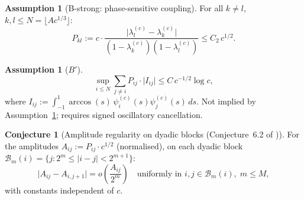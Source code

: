 \documentclass[12pt]{amsart}
\theoremstyle{definition}
\newtheorem{assumption}[theorem]{Assumption}
\newtheorem{conjecture}[theorem]{Conjecture}
\theoremstyle{remark}
\newcommand{\abs}[1]{\lvert#1\rvert}
\newcommand{\lam}[1]{\lambda_{#1}^{(c)}}
\begin{document}
\begin{assumption}[B-strong: phase-sensitive coupling]
\label{ass:Bstrong}
For all $k\neq l$, $k,l\leq N = \lfloor Ac^{1/3}\rfloor$:
\[
  P_{kl} := c\cdot
  \frac{\abs{\lam{l}-\lam{k}}}{(1-\lam{k})(1-\lam{l})}
  \leq C_2\,c^{1/2}.
\]
\end{assumption}

\begin{assumption}[$B'$]
\label{ass:Bprime}
\[
  \sup_{i\leq N}\sum_{j\neq i}P_{ij}\cdot\abs{I_{ij}}
  \leq C\,c^{-1/2}\log c,
\]
where $I_{ij}:=\int_{-1}^1\arccos(s)\,\psi_i^{(c)}(s)\psi_j^{(c)}(s)\,ds$.
Not implied by Assumption~\ref{ass:Bstrong};
requires signed oscillatory cancellation.
\end{assumption}

\begin{conjecture}[Amplitude regularity on dyadic blocks
  {\normalfont(Conjecture~6.2 of \cite{paperVI})}]
\label{conj:amplitude}
For the amplitudes $A_{ij}:=P_{ij}\cdot c^{1/2}$ (normalised),
on each dyadic block
$\mathcal{B}_m(i)=\{j:2^m\leq\abs{i-j}<2^{m+1}\}$:
\[
  \abs{A_{ij}-A_{i,j+1}}
  = o\!\left(\frac{A_{ij}}{2^m}\right)
  \quad\text{uniformly in }i,j\in\mathcal{B}_m(i),\;
  m\leq M,
\]
with constants independent of $c$.
\end{conjecture}
\end{document}
